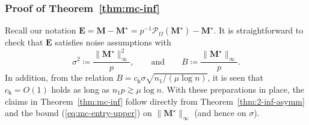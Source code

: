 \documentclass[compress,
mathserif,wide,%
]{beamer}
\begin{document}
\begin{frame}
	\frametitle{Proof of Theorem~\ref{thm:mc-inf}}
	Recall our notation $\bm{E}= \bm{M}  -\bm{M}^{\star}= p^{-1}\mathcal{P}_{\Omega}(\bm{M}^{\star})-\bm{M}^{\star}$.
 It is straightforward to check
that $\bm{E}$ satisfies noise assumptions with
%
\begin{equation}
\sigma^{2}\coloneqq\frac{\|\bm{M}^{\star}\|_{\infty}^{2}}{p},\qquad\text{and}\qquad B\coloneqq\frac{\|\bm{M}^{\star}\|_{\infty}}{p}. \label{eq:mc-inf-noise}
\end{equation}
%
In addition, from the relation $B= c_{\mathsf{b}}\sigma\sqrt{n_1/({\mu}\log n)}$, it is seen that $c_{\mathsf{b}}= O(1)$
holds as long as $n_{1}p\gtrsim\mu\log n$.
With these preparations in place, the claims in Theorem~\ref{thm:mc-inf} follow
directly from Theorem~\ref{thm:2-inf-asymm} and the bound (\ref{eq:mc-entry-upper}) on $\|\bm{M}^{\star}\|_{\infty}$
(and hence on $\sigma$).
\end{frame}
\end{document}
